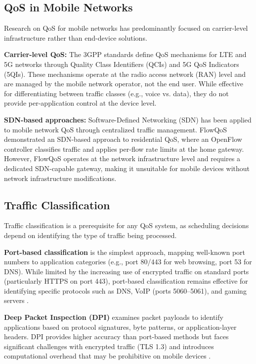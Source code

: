 \subsection{QoS in Mobile Networks}

Research on QoS for mobile networks has predominantly focused on carrier-level infrastructure rather than end-device solutions.

\textbf{Carrier-level QoS:} The 3GPP standards define QoS mechanisms for LTE and 5G networks through Quality Class Identifiers (QCIs) and 5G QoS Indicators (5QIs). These mechanisms operate at the radio access network (RAN) level and are managed by the mobile network operator, not the end user. While effective for differentiating between traffic classes (e.g., voice vs. data), they do not provide per-application control at the device level.

\textbf{SDN-based approaches:} Software-Defined Networking (SDN) has been applied to mobile network QoS through centralized traffic management. FlowQoS \cite{seddiki2015flowqos} demonstrated an SDN-based approach to residential QoS, where an OpenFlow controller classifies traffic and applies per-flow rate limits at the home gateway. However, FlowQoS operates at the network infrastructure level and requires a dedicated SDN-capable gateway, making it unsuitable for mobile devices without network infrastructure modifications.

\subsection{Traffic Classification}

Traffic classification is a prerequisite for any QoS system, as scheduling decisions depend on identifying the type of traffic being processed.

\textbf{Port-based classification} is the simplest approach, mapping well-known port numbers to application categories (e.g., port 80/443 for web browsing, port 53 for DNS). While limited by the increasing use of encrypted traffic on standard ports (particularly HTTPS on port 443), port-based classification remains effective for identifying specific protocols such as DNS, VoIP (ports 5060--5061), and gaming servers \cite{tanenbaum2021}.

\textbf{Deep Packet Inspection (DPI)} examines packet payloads to identify applications based on protocol signatures, byte patterns, or application-layer headers. DPI provides higher accuracy than port-based methods but faces significant challenges with encrypted traffic (TLS 1.3) and introduces computational overhead that may be prohibitive on mobile devices \cite{stallings2014data}.

